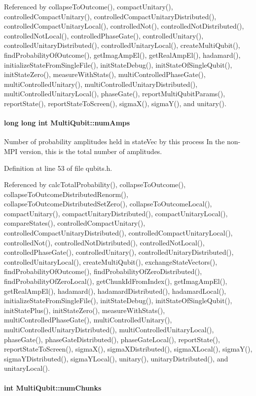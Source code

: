 Referenced by collapseToOutcome(), compactUnitary(), controlledCompactUnitary(), controlledCompactUnitaryDistributed(), controlledCompactUnitaryLocal(), controlledNot(), controlledNotDistributed(), controlledNotLocal(), controlledPhaseGate(), controlledUnitary(), controlledUnitaryDistributed(), controlledUnitaryLocal(), createMultiQubit(), findProbabilityOfOutcome(), getImagAmpEl(), getRealAmpEl(), hadamard(), initializeStateFromSingleFile(), initStateDebug(), initStateOfSingleQubit(), initStateZero(), measureWithStats(), multiControlledPhaseGate(), multiControlledUnitary(), multiControlledUnitaryDistributed(), multiControlledUnitaryLocal(), phaseGate(), reportMultiQubitParams(), reportState(), reportStateToScreen(), sigmaX(), sigmaY(), and unitary().\hypertarget{structMultiQubit_ae16f47d8b725c914fb7f66b6498d79db}{
\paragraph[{numAmps}]{\setlength{\rightskip}{0pt plus 5cm}long long int {\bf MultiQubit::numAmps}}\hfill}
\label{structMultiQubit_ae16f47d8b725c914fb7f66b6498d79db}


Number of probability amplitudes held in stateVec by this process In the non-\/MPI version, this is the total number of amplitudes. 

Definition at line 53 of file qubits.h.

Referenced by calcTotalProbability(), collapseToOutcome(), collapseToOutcomeDistributedRenorm(), collapseToOutcomeDistributedSetZero(), collapseToOutcomeLocal(), compactUnitary(), compactUnitaryDistributed(), compactUnitaryLocal(), compareStates(), controlledCompactUnitary(), controlledCompactUnitaryDistributed(), controlledCompactUnitaryLocal(), controlledNot(), controlledNotDistributed(), controlledNotLocal(), controlledPhaseGate(), controlledUnitary(), controlledUnitaryDistributed(), controlledUnitaryLocal(), createMultiQubit(), exchangeStateVectors(), findProbabilityOfOutcome(), findProbabilityOfZeroDistributed(), findProbabilityOfZeroLocal(), getChunkIdFromIndex(), getImagAmpEl(), getRealAmpEl(), hadamard(), hadamardDistributed(), hadamardLocal(), initializeStateFromSingleFile(), initStateDebug(), initStateOfSingleQubit(), initStatePlus(), initStateZero(), measureWithStats(), multiControlledPhaseGate(), multiControlledUnitary(), multiControlledUnitaryDistributed(), multiControlledUnitaryLocal(), phaseGate(), phaseGateDistributed(), phaseGateLocal(), reportState(), reportStateToScreen(), sigmaX(), sigmaXDistributed(), sigmaXLocal(), sigmaY(), sigmaYDistributed(), sigmaYLocal(), unitary(), unitaryDistributed(), and unitaryLocal().\hypertarget{structMultiQubit_acd43f2f57991709c9e94f73662c972b2}{
\paragraph[{numChunks}]{\setlength{\rightskip}{0pt plus 5cm}int {\bf MultiQubit::numChunks}}\hfill}
\label{structMultiQubit_acd43f2f57991709c9e94f73662c972b2}


